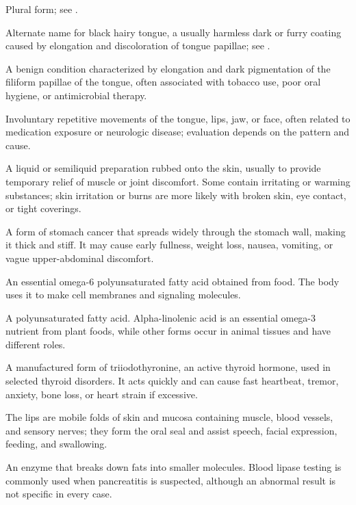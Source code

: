  Plural form; see .

 Alternate name for black hairy tongue, a usually harmless dark or furry coating caused by elongation and discoloration of tongue papillae; see .

 A benign condition characterized by elongation and dark pigmentation of the filiform
papillae of the tongue, often associated with tobacco use, poor oral hygiene, or
antimicrobial therapy.

 Involuntary repetitive movements of the tongue, lips, jaw, or face, often related to medication exposure or neurologic disease; evaluation depends on the pattern and cause.

 A liquid or semiliquid preparation rubbed onto the skin, usually to provide temporary relief of muscle or joint discomfort. Some contain irritating or warming substances; skin irritation or burns are more likely with broken skin, eye contact, or tight coverings.

 A form of stomach cancer that spreads widely through the stomach wall, making it thick and stiff. It may cause early fullness, weight loss, nausea, vomiting, or vague upper-abdominal discomfort.

 An essential omega-6 polyunsaturated fatty acid obtained from food. The body uses it to make cell membranes and signaling molecules.

 A polyunsaturated fatty acid. Alpha-linolenic acid is an essential omega-3 nutrient from plant foods, while other forms occur in animal tissues and have different roles.

 A manufactured form of triiodothyronine, an active thyroid hormone, used in selected thyroid disorders. It acts quickly and can cause fast heartbeat, tremor, anxiety, bone loss, or heart strain if excessive.

 The lips are mobile folds of skin and mucosa containing muscle, blood vessels, and sensory nerves; they form the oral seal and assist speech, facial expression, feeding, and swallowing.

 An enzyme that breaks down fats into smaller molecules. Blood lipase testing is commonly used when pancreatitis is suspected, although an abnormal result is not specific in every case.

